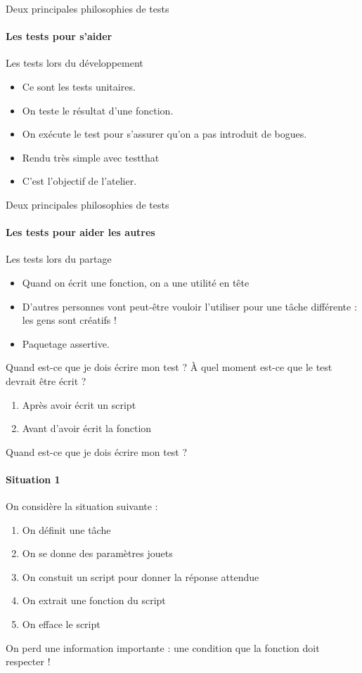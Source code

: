 \documentclass[11pt]{beamer}
\begin{document}
\begin{frame}{Deux principales philosophies de tests}
\framesubtitle{Les tests pour s'aider}
Les tests lors du développement
\begin{itemize}
\item Ce sont les tests unitaires.
\item On teste le résultat d'une fonction.
\item On exécute le test pour s'assurer qu'on a pas introduit de bogues.
\item Rendu très simple avec testthat
\item C'est l'objectif de l'atelier.
\end{itemize}
\end{frame}

\begin{frame}{Deux principales philosophies de tests}
\framesubtitle{Les tests pour aider les autres}
Les tests lors du partage
\begin{itemize}
\item Quand on écrit une fonction, on a une utilité en tête
\item D'autres personnes vont peut-être vouloir l'utiliser pour une tâche différente : les gens sont créatifs !
\item Paquetage assertive.
\end{itemize}
\end{frame}

\begin{frame}{Quand est-ce que je dois écrire mon test ?}
À quel moment est-ce que le test devrait être écrit ?
\begin{enumerate}
\item Après avoir écrit un script
\item Avant d'avoir écrit la fonction
\end{enumerate}
\end{frame}

\begin{frame}{Quand est-ce que je dois écrire mon test ?}
\framesubtitle{Situation 1}
On considère la situation suivante :
\begin{enumerate}
\item On définit une tâche
\item On se donne des paramètres jouets
\item On constuit un script pour donner la réponse attendue
\item On extrait une fonction du script
\item On efface le script
\end{enumerate}
On perd une information importante : une condition que la fonction doit respecter !
\end{frame}
\end{document}
